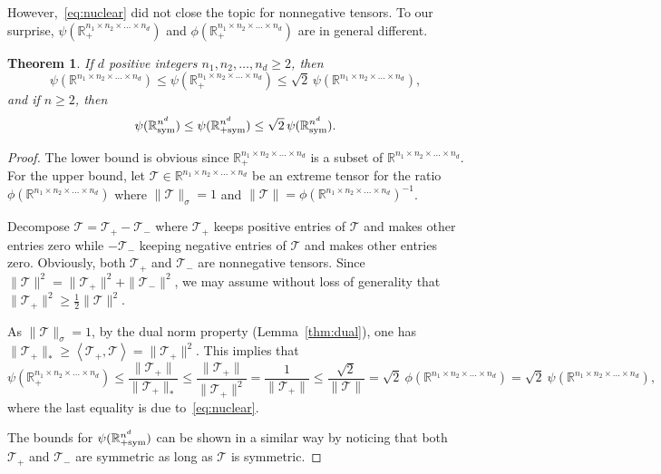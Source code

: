 \documentclass[11pt]{article}
\newtheorem{theorem}{Theorem}[section]
\newcommand{\R}{\mathbb{R}}
\newcommand{\TT}{\mathcal{T}}
\newcommand{\sym}{\textnormal{sym}}
\begin{document}
However,~\eqref{eq:nuclear} did not close the topic for nonnegative tensors. To our surprise, $\psi(\R_+^{n_1\times n_2\times \dots \times n_d})$ and $\phi(\R_+^{n_1\times n_2\times \dots \times n_d})$ are in general different.
\begin{theorem}\label{thm:nuclear}
If $d$ positive integers $n_1,n_2,\dots,n_d\ge2$, then %
$$
\psi(\R^{n_1\times n_2\times \dots\times n_d})\le \psi(\R^{n_1\times n_2\times \dots\times n_d}_+) \le \sqrt{2}\,\psi(\R^{n_1\times n_2\times \dots\times n_d}),
$$
and if $n\ge2$, then
$$
\psi(\R^{n^d}_\sym)\le \psi(\R^{n^d}_{+\sym}) \le \sqrt{2}\,\psi(\R^{n^d}_\sym).
$$
\end{theorem}
\begin{proof}
  The lower bound is obvious since $\R_+^{n_1\times n_2\times \dots\times n_d}$ is a subset of $\R^{n_1\times n_2\times \dots\times n_d}$. For the upper bound, let $\TT\in\R^{n_1\times n_2\times \dots\times n_d}$ be an extreme tensor for the ratio $\phi(\R^{n_1\times n_2\times \dots\times n_d})$ where $\|\TT\|_\sigma=1$ and $\|\TT\|=\phi(\R^{n_1\times n_2\times \dots\times n_d})^{-1}$.

  Decompose $\TT=\TT_+-\TT_-$ where $\TT_+$ keeps positive entries of $\TT$ and makes other entries zero while $-\TT_-$ keeping negative entries of $\TT$ and makes other entries zero. Obviously, both $\TT_+$ and $\TT_-$ are nonnegative tensors. Since $\|\TT\|^2=\|\TT_+\|^2+\|\TT_-\|^2$, we may assume without loss of generality that $\|\TT_+\|^2\ge\frac{1}{2}\|\TT\|^2$.

  As $\|\TT\|_\sigma=1$, by the dual norm property (Lemma~\ref{thm:dual}), one has $\|\TT_+\|_*\ge \left\langle \TT_+,\TT\right\rangle =\|\TT_+\|^2$. This implies that
  $$
  \psi(\R_+^{n_1\times n_2\times \dots\times n_d}) \le \frac{\|\TT_+\|}{\|\TT_+\|_*}\le \frac{\|\TT_+\|}{\|\TT_+\|^2} =\frac{1}{\|\TT_+\|} \le  \frac{\sqrt{2}}{\|\TT\|} = \sqrt{2}\:\!\phi(\R^{n_1\times n_2\times \dots\times n_d}) = \sqrt{2}\:\!\psi(\R^{n_1\times n_2\times \dots\times n_d}),
  $$
  where the last equality is due to~\eqref{eq:nuclear}.

  The bounds for $\psi(\R^{n^d}_{+\sym})$ can be shown in a similar way by noticing that both $\TT_+$ and $\TT_-$ are symmetric as long as $\TT$ is symmetric.
\end{proof}
\end{document}
